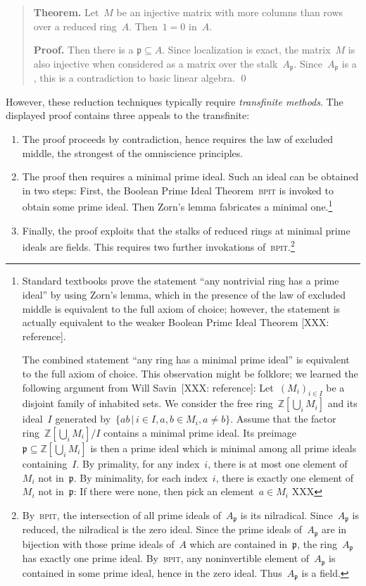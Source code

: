 \documentclass{ws-rv9x6}
\newcommand{\ZZ}{\mathbb{Z}}
\newcommand{\ppp}{\mathfrak{p}}
\renewcommand{\_}{\mathpunct{.}}
\newcommand{\?}{\,{:}\,}
\newcommand{\BPIT}{\textsc{bpit}\xspace}
\begin{document}
\begin{quote}
\textbf{Theorem.} Let~$M$ be an injective matrix with more columns than rows
over a reduced ring~$A$. Then~$1 = 0$ in~$A$.

\textbf{Proof.}  Then there is a  $\ppp \subseteq A$. Since localization is exact, the matrix~$M$ is also injective when
considered as a matrix over the stalk~$A_\ppp$. Since~$A_\ppp$ is a
, this is a contradiction to basic linear algebra. \qed
\end{quote}

However, these reduction techniques typically require \emph{transfinite
methods}. The displayed proof contains three appeals to the transfinite:
\begin{enumerate}
\item The proof proceeds by contradiction, hence requires the law of excluded
middle, the strongest of the omniscience principles.
\item The proof then requires a minimal prime ideal. Such an ideal can be
obtained in two steps: First, the Boolean Prime Ideal
Theorem~\BPIT is invoked to obtain some prime ideal. Then
Zorn's lemma fabricates a minimal one.\footnote{Standard textbooks prove the statement ``any nontrivial
ring has a prime ideal'' by using Zorn's lemma, which
in the presence of the law of excluded middle is equivalent to the full axiom
of choice; however, the statement is actually equivalent to the weaker Boolean
Prime Ideal Theorem [XXX: reference].

The combined statement ``any ring has a minimal prime ideal'' is equivalent to
the full axiom of choice. This observation might be folklore; we learned the
following argument from Will Savin~[XXX: reference]: Let~$(M_i)_{i \in I}$ be a
disjoint family of inhabited sets. We consider the free ring~$\ZZ[\bigcup_i M_i]$ and
its ideal~$I$ generated by~$\{ ab \,|\, i \in I, a,b \in M_i, a \neq b \}$. Assume
that the factor ring~$\ZZ[\bigcup_i M_i]/I$ contains a minimal prime ideal. Its
preimage~$\ppp \subseteq \ZZ[\bigcup_i M_i]$ is then a prime ideal which is
minimal among all prime ideals containing~$I$. By primality, for any index~$i$,
there is at most one element of~$M_i$ not in~$\ppp$. By minimality, for each
index~$i$, there is exactly one element of~$M_i$ not in~$\ppp$: If there were
none, then pick an element~$a \in M_i$ XXX}
\item Finally, the proof exploits that the stalks of reduced rings at minimal
prime ideals are fields. This requires two further invokations
of~\BPIT.\footnote{By~\BPIT, the intersection of all prime ideals of~$A_\ppp$
is its nilradical. Since~$A_\ppp$ is reduced, the nilradical is the zero ideal.
Since the prime ideals of~$A_\ppp$ are in bijection with those prime ideals
of~$A$ which are contained in~$\ppp$, the ring~$A_\ppp$ has exactly one prime
ideal. By~\BPIT, any noninvertible element of~$A_\ppp$ is contained in some
prime ideal, hence in the zero ideal. Thus~$A_\ppp$ is a field.}
\end{enumerate}
\end{document}
